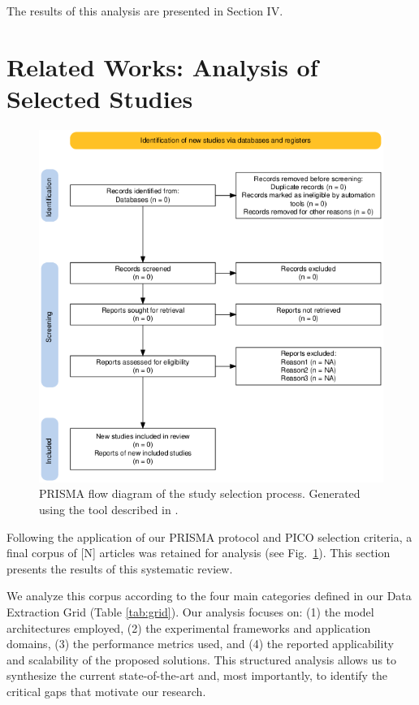 \documentclass[conference]{IEEEtran}
\begin{document}
The results of this analysis are presented in Section IV.

\section{Related Works: Analysis of Selected Studies}

\begin{figure}[htbp]
\centerline{\includegraphics[width=\columnwidth]{prisma_flow.png}}
\caption{PRISMA flow diagram of the study selection process. Generated using the tool described in \cite{haddawayPRISMA2020PackageShiny2022}.}
\label{fig:prisma}
\end{figure}

Following the application of our PRISMA protocol and PICO selection criteria, a final corpus of [N] articles was retained for analysis (see Fig.~\ref{fig:prisma}). This section presents the results of this systematic review. 

We analyze this corpus according to the four main categories defined in our Data Extraction Grid (Table \ref{tab:grid}). Our analysis focuses on: (1) the model architectures employed, (2) the experimental frameworks and application domains, (3) the performance metrics used, and (4) the reported applicability and scalability of the proposed solutions. This structured analysis allows us to synthesize the current state-of-the-art and, most importantly, to identify the critical gaps that motivate our research.
\end{document}
